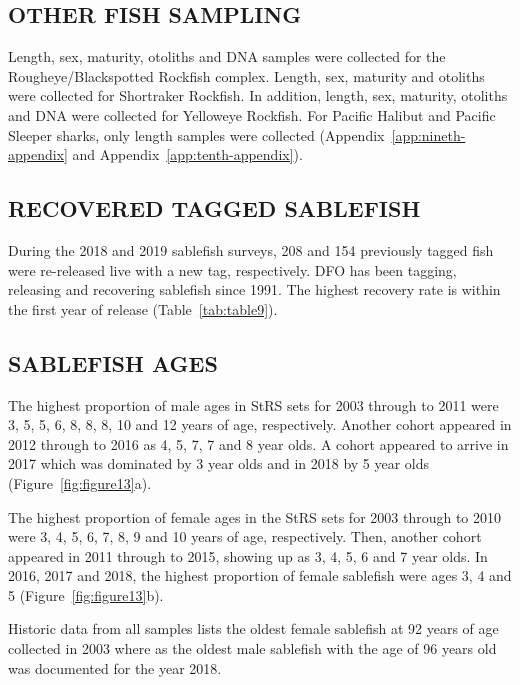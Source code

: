 \documentclass[12pt]{article}\usepackage[]{graphicx}\usepackage[]{color}
\begin{document}
\hypertarget{other-fish-sampling}{%
\subsection{OTHER FISH SAMPLING}\label{other-fish-sampling}}

Length, sex, maturity, otoliths and DNA samples were collected for the Rougheye/Blackspotted Rockfish complex. Length, sex, maturity and otoliths were collected for Shortraker Rockfish. In addition, length, sex, maturity, otoliths and DNA were collected for Yelloweye Rockfish. For Pacific Halibut and Pacific Sleeper sharks, only length samples were collected (Appendix~\ref{app:nineth-appendix} and Appendix~\ref{app:tenth-appendix}).

\hypertarget{recovered-tagged-sablefish}{%
\subsection{RECOVERED TAGGED SABLEFISH}\label{recovered-tagged-sablefish}}

During the 2018 and 2019 sablefish surveys, 208 and 154 previously tagged fish were re-released live with a new tag, respectively. DFO has been tagging, releasing and recovering sablefish since 1991. The highest recovery rate is within the first year of release (Table~\ref{tab:table9}).

\hypertarget{sablefish-ages}{%
\subsection{SABLEFISH AGES}\label{sablefish-ages}}

The highest proportion of male ages in StRS sets for 2003 through to 2011 were 3, 5, 5, 6, 8, 8, 8, 10 and 12 years of age, respectively. Another cohort appeared in 2012 through to 2016 as 4, 5, 7, 7 and 8 year olds. A cohort appeared to arrive in 2017 which was dominated by 3 year olds and in 2018 by 5 year olds (Figure~\ref{fig:figure13}a).

The highest proportion of female ages in the StRS sets for 2003 through to 2010 were 3, 4, 5, 6, 7, 8, 9 and 10 years of age, respectively. Then, another cohort appeared in 2011 through to 2015, showing up as 3, 4, 5, 6 and 7 year olds. In 2016, 2017 and 2018, the highest proportion of female sablefish were ages 3, 4 and 5 (Figure~\ref{fig:figure13}b).

Historic data from all samples lists the oldest female sablefish at 92 years of age collected in 2003 where as the oldest male sablefish with the age of 96 years old was documented for the year 2018.
\end{document}
